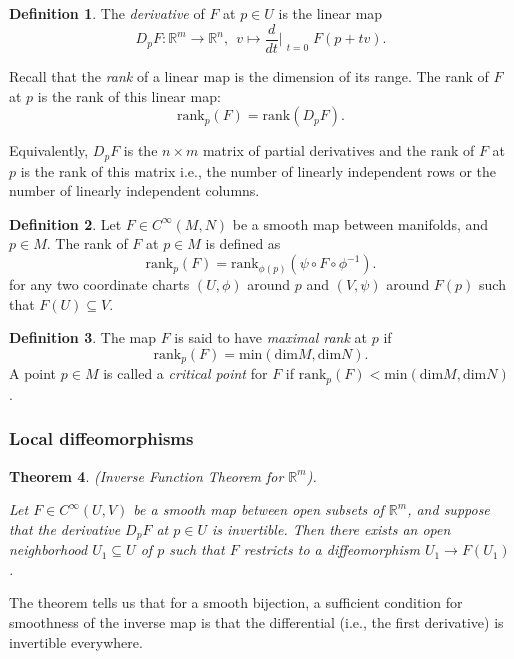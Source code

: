 \documentclass{article}
\newtheorem{theorem}{Theorem}[section]
\theoremstyle{definition}
\newtheorem{defn}[theorem]{Definition}
\newenvironment{definition}
  {\vspace{8pt}\begin{mdframed}[backgroundcolor=blueish]\begin{defn}}
  {\end{defn}\end{mdframed}\vspace{4pt}}
\begin{document}
\begin{definition}
The \textit{derivative} of $F$ at $p \in U$ is the linear map
\[
    D_pF : \mathbb R^m \rightarrow \mathbb R^n, \ \ v \mapsto \frac{d}{dt}\Bigr|_{\substack{ t=0 }} F(p+tv).
\]

Recall that the \textit{rank} of a linear map is the dimension of its range. The rank of $F$ at $p$ is the rank of this linear map:
\[
    \text{rank}_p(F) = \text{rank}(D_p F).
\]
\end{definition}

Equivalently, $D_p F$ is the $n \times m$ matrix of partial derivatives and the rank of $F$ at $p$ is the rank of this matrix i.e., the number of linearly independent rows or the number of linearly independent columns.

\begin{definition}
    Let $F \in C^\infty(M,N)$ be a smooth map between manifolds, and $p \in M$. The rank of $F$ at $p \in M$ is defined as
    \[
        \text{rank}_p(F) = \text{rank}_{\phi(p)}(\psi \circ F \circ \phi^{-1}).
    \]
    for any two coordinate charts $(U,\phi)$ around $p$ and $(V,\psi)$ around $F(p)$ such that $F(U) \subseteq V$.
\end{definition}


\begin{definition}
    The map $F$ is said to have \textit{maximal rank} at $p$ if
    \[
        \text{rank}_p(F) = \text{min}(\text{dim} M, \text{dim} N).
    \]
    A point $p \in M$ is called a \textit{critical point} for $F$ if $\text{rank}_p(F) < \text{min}(\text{dim} M, \text{dim} N)$.
\end{definition}

\subsubsection{Local diffeomorphisms}

\begin{theorem} (Inverse Function Theorem for $\mathbb R^m$).

Let $F \in C^\infty(U,V)$ be a smooth map between open subsets of $\mathbb R^m$, and suppose that the derivative $D_pF$ at $p \in U$ is invertible. Then there exists an open neighborhood $U_1 \subseteq U$ of $p$ such that $F$ restricts to a diffeomorphism $U_1 \rightarrow F(U_1)$.
\end{theorem}

The theorem tells us that for a smooth bijection, a sufficient condition for smoothness of the inverse map is that the differential (i.e., the first derivative) is invertible everywhere.
\end{document}
